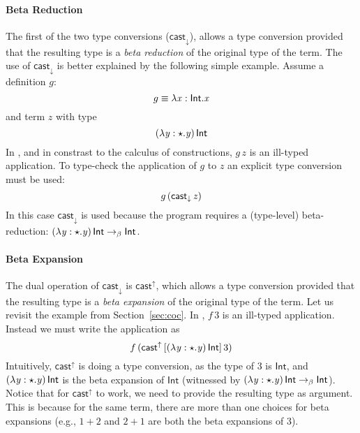 \paragraph{Beta Reduction} The first of the two type conversions
($ \mathsf{cast}_{\downarrow} $), allows a type conversion provided that the resulting
type is a \emph{beta reduction} of the original type of the term. The
use of $ \mathsf{cast}_{\downarrow} $ is better explained by the following simple
example. Assume a definition $g$:
\[ g \equiv \lambda  \mathit{x}  :  \mathsf{Int}  .  \mathit{x} \]
and term $z$ with type
\[ (  \lambda  \mathit{y}  :  \star  .  \mathit{y}  ) \, \mathsf{Int} \]
In \name, and in constrast to the calculus of constructions,
$ g\,z $ is an ill-typed application. To type-check 
the application of $g$ to $z$ an explicit type conversion 
must be used:
\[ g\,(\mathsf{cast}_{\downarrow} \, \mathit{z}) \]
In this case $ \mathsf{cast}_{\downarrow} $ is used because the program requires 
a (type-level) beta-reduction: 
$(  \lambda  \mathit{y}  :  \star  .  \mathit{y}  ) \, \mathsf{Int} \rightarrow_{\beta}  \mathsf{Int} $. 

\paragraph{Beta Expansion} The dual operation of $ \mathsf{cast}_{\downarrow} $ is
$ \mathsf{cast}^{\uparrow} $, which allows a type conversion provided that the
resulting type is a \emph{beta expansion} of the original type of the
term.  Let us revisit the example from Section~\ref{sec:coc}. In \name,
$f\,3$ is an ill-typed application. Instead we must write the
application as
\[ f\,(\mathsf{cast}^{\uparrow} \, [  (  \lambda  \mathit{y}  :  \star  .  \mathit{y}  ) \, \mathsf{Int}  ] \,  3) \]
Intuitively,
$ \mathsf{cast}^{\uparrow} $ is doing a type conversion, as the type of $ 3 $ is
$  \mathsf{Int}  $, and $ (  \lambda  \mathit{y}  :  \star  .  \mathit{y}  ) \, \mathsf{Int} $ is the beta expansion of
$ \mathsf{Int} $ (witnessed by
$(  \lambda  \mathit{y}  :  \star  .  \mathit{y}  ) \, \mathsf{Int} \rightarrow_{\beta}  \mathsf{Int} $). Notice that for
$ \mathsf{cast}^{\uparrow} $ to work, we need to provide the resulting type as
argument. This is because for the same term, there are more than one
choices for beta expansions (e.g., $1 + 2$ and $2 + 1$ are both the
beta expansions of $3$). 

